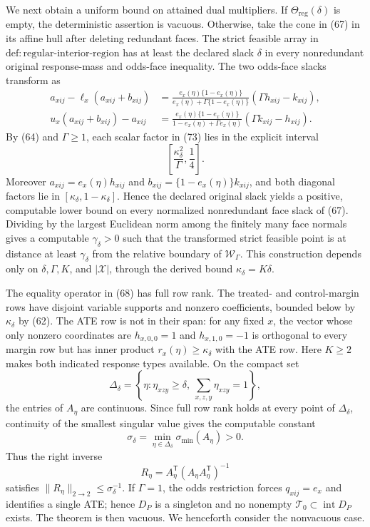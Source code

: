 We next obtain a uniform bound on attained dual multipliers.  If \(\Theta_{\mathrm{reg}}(\delta)\) is empty, the deterministic assertion is vacuous.  Otherwise, take the cone in (67) in its affine hull after deleting redundant faces.  The strict feasible array in \(\mathrm{def{:}regular\mbox{-}interior\mbox{-}region}\) has at least the declared slack \(\delta\) in every nonredundant original response-mass and odds-face inequality.  The two odds-face slacks transform as
\[
\begin{aligned}
a_{xij}-\ell_x(a_{xij}+b_{xij})
&=\frac{e_x(\eta)\{1-e_x(\eta)\}}
{e_x(\eta)+\Gamma\{1-e_x(\eta)\}}
(\Gamma h_{xij}-k_{xij}),\\
u_x(a_{xij}+b_{xij})-a_{xij}
&=\frac{e_x(\eta)\{1-e_x(\eta)\}}
{1-e_x(\eta)+\Gamma e_x(\eta)}
(\Gamma k_{xij}-h_{xij}).
\end{aligned}
\tag{73}
\]
By (64) and \(\Gamma\geq1\), each scalar factor in (73) lies in the explicit interval
\[
\left[\frac{\kappa_\delta^2}{\Gamma},\frac14\right].
\tag{74}
\]
Moreover \(a_{xij}=e_x(\eta)h_{xij}\) and \(b_{xij}=\{1-e_x(\eta)\}k_{xij}\), and both diagonal factors lie in \([\kappa_\delta,1-\kappa_\delta]\).  Hence the declared original slack yields a positive, computable lower bound on every normalized nonredundant face slack of (67).  Dividing by the largest Euclidean norm among the finitely many face normals gives a computable \(\gamma_\delta>0\) such that the transformed strict feasible point is at distance at least \(\gamma_\delta\) from the relative boundary of \(\mathcal W_\Gamma\).  This construction depends only on \(\delta,\Gamma,K\), and \(|\mathcal X|\), through the derived bound \(\kappa_\delta=K\delta\).

The equality operator in (68) has full row rank.  The treated- and control-margin rows have disjoint variable supports and nonzero coefficients, bounded below by \(\kappa_\delta\) by (62).  The ATE row is not in their span: for any fixed \(x\), the vector whose only nonzero coordinates are \(h_{x,0,0}=1\) and \(h_{x,1,0}=-1\) is orthogonal to every margin row but has inner product \(r_x(\eta)\geq\kappa_\delta\) with the ATE row.  Here \(K\geq2\) makes both indicated response types available.  On the compact set
\[
\Delta_\delta
=\left\{\eta:\eta_{xzy}\geq\delta,
\ \sum_{x,z,y}\eta_{xzy}=1\right\},
\tag{75}
\]
the entries of \(A_\eta\) are continuous.  Since full row rank holds at every point of \(\Delta_\delta\), continuity of the smallest singular value gives the computable constant
\[
\sigma_\delta
=\min_{\eta\in\Delta_\delta}\sigma_{\min}(A_\eta)>0.
\tag{76}
\]
Thus the right inverse
\[
R_\eta=A_\eta^{\mathsf T}(A_\eta A_\eta^{\mathsf T})^{-1}
\tag{77}
\]
satisfies \(\|R_\eta\|_{2\to2}\leq\sigma_\delta^{-1}\).  If \(\Gamma=1\), the odds restriction forces \(q_{xij}=e_x\) and identifies a single ATE; hence \(D_P\) is a singleton and no nonempty \(\mathcal T_0\subset\operatorname{int}D_P\) exists.  The theorem is then vacuous.  We henceforth consider the nonvacuous case.

